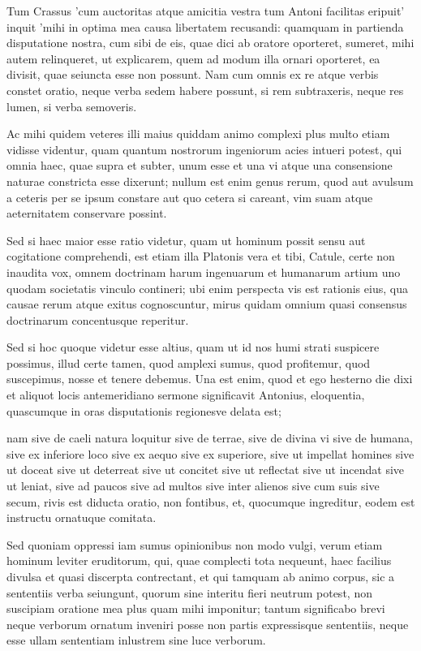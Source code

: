  Tum Crassus 'cum auctoritas atque amicitia vestra tum Antoni facilitas eripuit' inquit 'mihi in optima mea causa libertatem recusandi: quamquam in partienda disputatione nostra, cum sibi de eis, quae dici ab oratore oporteret, sumeret, mihi autem relinqueret, ut explicarem, quem ad modum illa ornari oporteret, ea divisit, quae seiuncta esse non possunt. Nam cum omnis ex re atque verbis constet oratio, neque verba sedem habere possunt, si rem subtraxeris, neque res lumen, si verba semoveris.

 Ac mihi quidem veteres illi maius quiddam animo complexi plus multo etiam vidisse videntur, quam quantum nostrorum ingeniorum acies intueri potest, qui omnia haec, quae supra et subter, unum esse et una vi atque una consensione naturae constricta esse dixerunt; nullum est enim genus rerum, quod aut avulsum a ceteris per se ipsum constare aut quo cetera si careant, vim suam atque aeternitatem conservare possint.

 Sed si haec maior esse ratio videtur, quam ut hominum possit sensu aut cogitatione comprehendi, est etiam illa Platonis vera et tibi, Catule, certe non inaudita vox, omnem doctrinam harum ingenuarum et humanarum artium uno quodam societatis vinculo contineri; ubi enim perspecta vis est rationis eius, qua causae rerum atque exitus cognoscuntur, mirus quidam omnium quasi consensus doctrinarum concentusque reperitur.

 Sed si hoc quoque videtur esse altius, quam ut id nos humi strati suspicere possimus, illud certe tamen, quod amplexi sumus, quod profitemur, quod suscepimus, nosse et tenere debemus. Una est enim, quod et ego hesterno die dixi et aliquot locis antemeridiano sermone significavit Antonius, eloquentia, quascumque in oras disputationis regionesve delata est;

 nam sive de caeli natura loquitur sive de terrae, sive de divina vi sive de humana, sive ex inferiore loco sive ex aequo sive ex superiore, sive ut impellat homines sive ut doceat sive ut deterreat sive ut concitet sive ut reflectat sive ut incendat sive ut leniat, sive ad paucos sive ad multos sive inter alienos sive cum suis sive secum, rivis est diducta oratio, non fontibus, et, quocumque ingreditur, eodem est instructu ornatuque comitata.

 Sed quoniam oppressi iam sumus opinionibus non modo vulgi, verum etiam hominum leviter eruditorum, qui, quae complecti tota nequeunt, haec facilius divulsa et quasi discerpta contrectant, et qui tamquam ab animo corpus, sic a sententiis verba seiungunt, quorum sine interitu fieri neutrum potest, non suscipiam oratione mea plus quam mihi imponitur; tantum significabo brevi neque verborum ornatum inveniri posse non partis expressisque sententiis, neque esse ullam sententiam inlustrem sine luce verborum.


